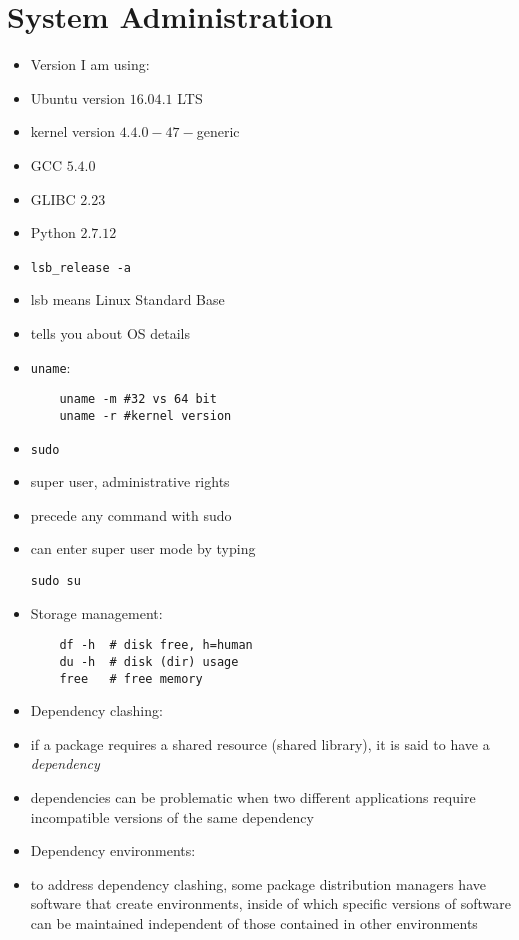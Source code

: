 \documentclass[twocolumn]{IEEEtran} %
\begin{document}
\section{System Administration}
\begin{itemize}
    \item Version I am using:
    \bi
        \item Ubuntu version $16.04.1$ LTS
        \item kernel version $4.4.0-47-$generic
        \item GCC $5.4.0$
        \item GLIBC $2.23$
        \item Python $2.7.12$
    \ei
    \item \verb|lsb_release -a|
    \bi
        \item lsb means Linux Standard Base
        \item tells you about OS details
    \ei
    \item \verb|uname|:
    \begin{verbatim}
    uname -m #32 vs 64 bit
    uname -r #kernel version
    \end{verbatim}
    \item \verb|sudo|
    \bi
        \item super user, administrative rights
        \item precede any command with sudo
        \item can enter super user mode by typing
        \begin{verbatim}
sudo su
        \end{verbatim}
    \ei
    \item Storage management:
    \begin{verbatim}
    df -h  # disk free, h=human
    du -h  # disk (dir) usage
    free   # free memory
    \end{verbatim}
     \item Dependency clashing:
    \bi
       \item if a package requires a shared resource (shared library), it is said to have a \emph{dependency}
       \item dependencies can be problematic when two different applications require incompatible versions of the same dependency
    \ei
    \item Dependency environments:
    \bi
        \item to address dependency clashing, some package distribution managers have software that create environments, inside of which specific versions of software can be maintained independent of those contained in other environments

\end{itemize}
\end{document}
